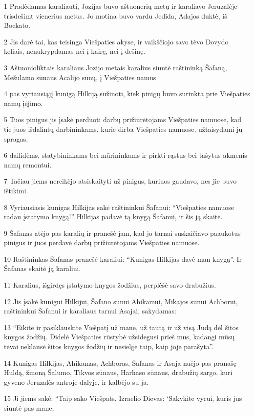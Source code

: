 \par 1 Pradėdamas karaliauti, Jozijas buvo aštuonerių metų ir karaliavo Jeruzalėje trisdešimt vienerius metus. Jo motina buvo vardu Jedida, Adajos duktė, iš Bockato. 
\par 2 Jis darė tai, kas teisinga Viešpaties akyse, ir vaikščiojo savo tėvo Dovydo keliais, nenukrypdamas nei į kairę, nei į dešinę. 
\par 3 Aštuonioliktais karaliaus Jozijo metais karalius siuntė raštininką Šafaną, Mešulamo sūnaus Acalijo sūnų, į Viešpaties namus 
\par 4 pas vyriausiąjį kunigą Hilkiją sužinoti, kiek pinigų buvo surinkta prie Viešpaties namų įėjimo. 
\par 5 Tuos pinigus jis įsakė perduoti darbų prižiūrėtojams Viešpaties namuose, kad tie juos išdalintų darbininkams, kurie dirba Viešpaties namuose, užtaisydami jų spragas, 
\par 6 dailidėms, statybininkams bei mūrininkams ir pirkti rąstus bei tašytus akmenis namų remontui. 
\par 7 Tačiau jiems nereikėjo atsiskaityti už pinigus, kuriuos gaudavo, nes jie buvo ištikimi. 
\par 8 Vyriausiasis kunigas Hilkijas sakė raštininkui Šafanui: “Viešpaties namuose radau įstatymo knygą!” Hilkijas padavė tą knygą Šafanui, ir šis ją skaitė. 
\par 9 Šafanas atėjo pas karalių ir pranešė jam, kad jo tarnai suskaičiavo paaukotus pinigus ir juos perdavė darbų prižiūrėtojams Viešpaties namuose. 
\par 10 Raštininkas Šafanas pranešė karaliui: “Kunigas Hilkijas davė man knygą”. Ir Šafanas skaitė ją karaliui. 
\par 11 Karalius, išgirdęs įstatymo knygos žodžius, perplėšė savo drabužius. 
\par 12 Jis įsakė kunigui Hilkijui, Šafano sūnui Ahikamui, Mikajos sūnui Achborui, raštininkui Šafanui ir karaliaus tarnui Asajai, sakydamas: 
\par 13 “Eikite ir pasiklauskite Viešpatį už mane, už tautą ir už visą Judą dėl šitos knygos žodžių. Didelė Viešpaties rūstybė užsidegusi prieš mus, kadangi mūsų tėvai neklausė šitos knygos žodžių ir nesielgė taip, kaip joje parašyta”. 
\par 14 Kunigas Hilkijas, Ahikamas, Achboras, Šafanas ir Asaja nuėjo pas pranašę Huldą, žmoną Šalumo, Tikvos sūnaus, Harhaso sūnaus, drabužių sargo, kuri gyveno Jeruzalės antroje dalyje, ir kalbėjo su ja. 
\par 15 Ji jiems sakė: “Taip sako Viešpats, Izraelio Dievas: ‘Sakykite vyrui, kuris jus siuntė pas mane, 
